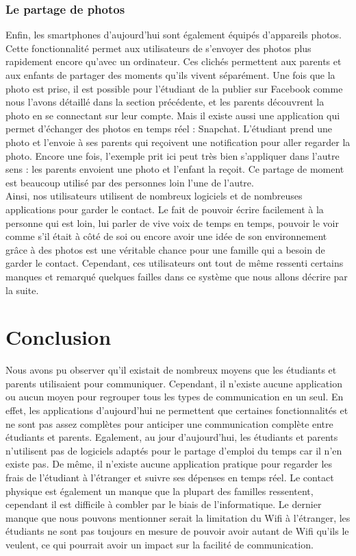 \documentclass[12pt]{article}
\begin{document}
 \subsubsection{Le partage de photos}
Enfin, les smartphones d'aujourd'hui sont également équipés d'appareils photos. Cette fonctionnalité permet aux utilisateurs de s'envoyer des photos plus rapidement encore qu'avec un ordinateur. Ces clichés permettent aux parents et aux enfants de partager des moments qu'ils vivent séparément. Une fois que la photo est prise, il est possible pour l'étudiant de la publier sur Facebook comme nous l'avons détaillé dans la section précédente, et les parents découvrent la photo en se connectant sur leur compte. Mais il existe aussi une application qui permet d'échanger des photos en temps réel : Snapchat. L'étudiant prend une photo et l'envoie à ses parents qui reçoivent une notification pour aller regarder la photo. Encore une fois, l'exemple prit ici peut très bien s'appliquer dans l'autre sens : les parents envoient une photo et l'enfant la reçoit. Ce partage de moment est beaucoup utilisé par des personnes loin l'une de l'autre. ~\\

Ainsi, nos utilisateurs utilisent de nombreux logiciels et de nombreuses applications pour garder le contact. Le fait de pouvoir écrire facilement à la personne qui est loin, lui parler de vive voix de temps en temps, pouvoir le voir comme s'il était à côté de soi ou encore avoir une idée de son environnement grâce à des photos est une véritable chance pour une famille qui a besoin de garder le contact. Cependant, ces utilisateurs ont tout de même ressenti certains manques et remarqué quelques failles dans ce système que nous allons décrire par la suite.


\section{Conclusion}

Nous avons pu observer qu’il existait de nombreux moyens que les étudiants et parents utilisaient pour communiquer. Cependant, il n’existe aucune application ou aucun moyen pour regrouper tous les types de communication en un seul. En effet, les applications d’aujourd’hui ne permettent que certaines fonctionnalités et ne sont pas assez complètes pour anticiper une communication complète entre étudiants et parents.
Egalement, au jour d’aujourd’hui, les étudiants et parents n’utilisent pas de logiciels adaptés pour le partage d’emploi du temps car il n’en existe pas. De même, il n’existe aucune application pratique pour regarder les frais de l’étudiant à l’étranger et suivre ses dépenses en temps réel.
Le contact physique est également un manque que la plupart des familles ressentent, cependant il est difficile à combler par le biais de l’informatique.
Le dernier manque que nous pouvons mentionner serait la limitation du Wifi à l’étranger, les étudiants ne sont pas toujours en mesure de pouvoir avoir autant de Wifi qu’ils le veulent, ce qui pourrait avoir un impact sur la facilité de communication.
\end{document}
